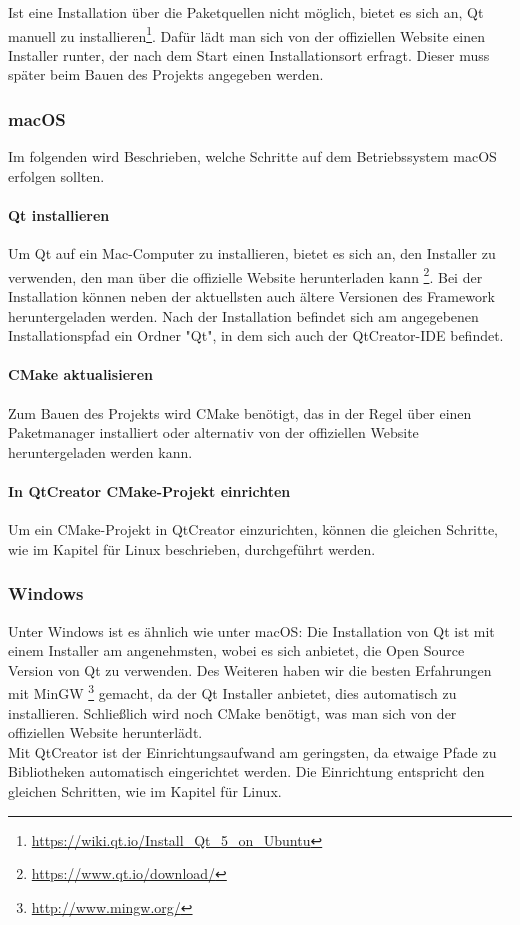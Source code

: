 Ist eine Installation über die Paketquellen nicht möglich, bietet es sich an, Qt manuell
zu installieren\footnote{\url{https://wiki.qt.io/Install_Qt_5_on_Ubuntu}}. Dafür lädt
man sich von der offiziellen Website einen Installer runter, der nach dem Start einen
Installationsort erfragt. Dieser muss später beim Bauen des Projekts angegeben werden.



\subsubsection{macOS}
Im folgenden wird Beschrieben, welche Schritte auf dem Betriebssystem macOS erfolgen sollten.
\paragraph{Qt installieren}

Um Qt auf ein Mac-Computer zu installieren, bietet es sich an, den Installer zu
verwenden, den man über die offizielle Website herunterladen kann
\footnote{\url{https://www.qt.io/download/}}. Bei der Installation können neben der
aktuellsten auch ältere Versionen des Framework heruntergeladen werden. Nach
der Installation befindet sich am angegebenen Installationspfad ein Ordner "Qt",
in dem sich auch der QtCreator-IDE befindet.

\paragraph{CMake aktualisieren}

Zum Bauen des Projekts wird CMake benötigt, das in der Regel über einen
Paketmanager installiert oder alternativ von der offiziellen Website
heruntergeladen werden kann.

\paragraph{In QtCreator CMake-Projekt einrichten}

Um ein CMake-Projekt in QtCreator einzurichten, können die gleichen Schritte, wie
im Kapitel für Linux beschrieben, durchgeführt werden.

\subsubsection{Windows}

Unter Windows ist es ähnlich wie unter macOS: Die Installation von Qt ist mit
einem Installer am angenehmsten, wobei es sich anbietet, die Open Source Version
von Qt zu verwenden. Des Weiteren haben wir die besten Erfahrungen mit MinGW
\footnote{\url{http://www.mingw.org/}} gemacht, da der Qt Installer anbietet,
dies automatisch zu installieren. Schließlich wird noch CMake benötigt, was man
sich von der offiziellen Website herunterlädt. \\
Mit QtCreator ist der Einrichtungsaufwand am geringsten, da etwaige Pfade zu
Bibliotheken automatisch eingerichtet werden. Die Einrichtung entspricht den
gleichen Schritten, wie im Kapitel für Linux.

